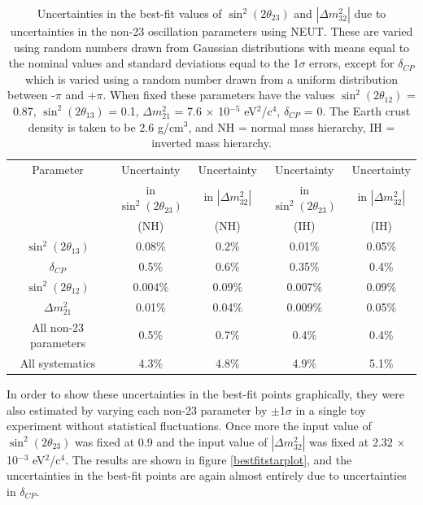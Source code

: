 \begin{table}
\caption[Uncertainties in the best-fit values of $\sin^{2}(2 \theta_{23})$ and $|\Delta m_{32}^{2}|$ due to uncertainties in the non-23
oscillation parameters using NEUT]
{Uncertainties in the best-fit values of $\sin^{2}(2 \theta_{23})$ and $|\Delta m_{32}^{2}|$ due to uncertainties in the non-23 
oscillation parameters using NEUT. These are varied using random numbers drawn from Gaussian distributions with means equal to the nominal values and 
standard deviations equal to the 1$\sigma$ errors, except for $\delta_{CP}$ which is varied using a random number drawn from a uniform 
distribution between -$\pi$ and +$\pi$. When fixed these parameters have the values $\sin^{2}(2 \theta_{12})$ = 0.87, $\sin^{2}(2 \theta_{13})$ 
= 0.1, $\Delta m_{21}^{2}$ = 7.6 $\times$ 10$^{-5}$ eV$^{2}$/c$^{4}$, $\delta_{CP}$ = 0. The Earth crust density is taken to be 2.6 g/cm$^{3}$, and NH = 
normal mass hierarchy, IH = inverted mass hierarchy.}
\centering
\begin{tabular}{| c | c | c | c | c |}
\hline
Parameter & Uncertainty & Uncertainty & Uncertainty & Uncertainty \\
 & in $\sin^{2}(2 \theta_{23})$ & in $|\Delta m_{32}^{2}|$ & in $\sin^{2}(2 \theta_{23})$ & in $|\Delta m_{32}^{2}|$ \\
 & (NH) & (NH) & (IH) & (IH) \\
\hline
$\sin^{2}(2 \theta_{13})$ & 0.08\% & 0.2\% & 0.01\% & 0.05\%\\
\hline
$\delta_{CP}$ & 0.5\% & 0.6\% &  0.35\% & 0.4\%\\
\hline
$\sin^{2}(2 \theta_{12})$ & 0.004\% & 0.09\% & 0.007\% & 0.09\%\\
\hline
$\Delta m_{21}^{2}$ & 0.01\% & 0.04\% & 0.009\%  & 0.05\%\\
\hline
All non-23 parameters & 0.5\% & 0.7\% & 0.4\% & 0.4\%\\
\hline
All systematics & 4.3\% & 4.8\% & 4.9\% & 5.1\%\\
\hline
\end{tabular}
\label{bestfitnon23errors}
\end{table}

In order to show these uncertainties in the best-fit points graphically, they were also estimated by varying each non-23 parameter 
by $\pm$1$\sigma$ in a single toy experiment without statistical fluctuations. Once more the input value of $\sin^{2}(2 \theta_{23})$ was fixed 
at 0.9 and the input value of $|\Delta m_{32}^{2}|$ was fixed at 2.32 $\times$ 10$^{-3}$ eV$^{2}$/c$^{4}$. The results are shown in figure \ref{bestfitstarplot}, 
and the uncertainties in the best-fit points are again almost entirely due to uncertainties in $\delta_{CP}$.

